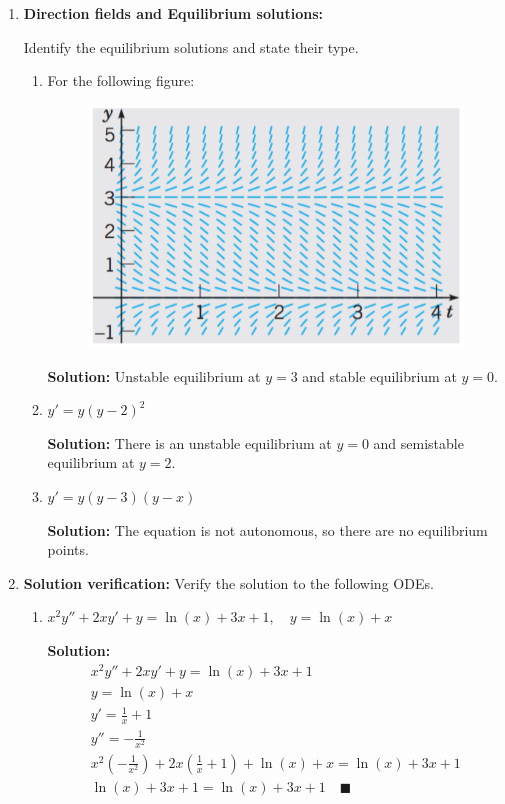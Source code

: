 \documentclass[letterpaper, fontsize=11pt]{scrartcl} %
\numberwithin{equation}{section} %
\numberwithin{figure}{section} %
\numberwithin{table}{section} %
\begin{document}
\begin{enumerate}

\item \textbf{Direction fields and Equilibrium solutions:} \par Identify the equilibrium solutions and state their type.
\begin{enumerate}

\item For the following figure:
\begin{figure}[h]
\centering \includegraphics[width = 0.4\columnwidth]{finalReview1.png}
\end{figure}
\par \textbf{Solution:} Unstable equilibrium at $y = 3$ and stable equilibrium at $y = 0$. 
\item  $y' = y(y-2)^2$
\par \textbf{Solution:} There is an unstable equilibrium at $y=0$ and semistable equilibrium at $y = 2$.

\item $y' = y(y - 3)(y-x)$ 
\par \textbf{Solution:} The equation is not autonomous, so there are no equilibrium points. 

\end{enumerate}

\item \textbf{Solution verification:} Verify the solution to the following ODEs. 
\begin{enumerate}

\item $x^2y''  + 2xy'  + y = \ln(x) + 3x + 1,\quad y = \ln(x) + x$
\par \textbf{Solution:} 
\begin{gather*}
x^2y''  + 2xy'  + y = \ln(x) + 3x + 1 \\
y = \ln(x) + x \\
y' = \frac{1}{x} + 1\\
y'' = -\frac{1}{x^2} \\
x^2\left(-\frac{1}{x^2}\right)  + 2x\left(\frac{1}{x} + 1\right)  + \ln(x) + x = \ln(x) + 3x + 1 \\
\ln(x) + 3x + 1  = \ln(x) + 3x + 1 \quad\blacksquare
\end{gather*}


\end{enumerate}
\end{enumerate}
\end{document}
